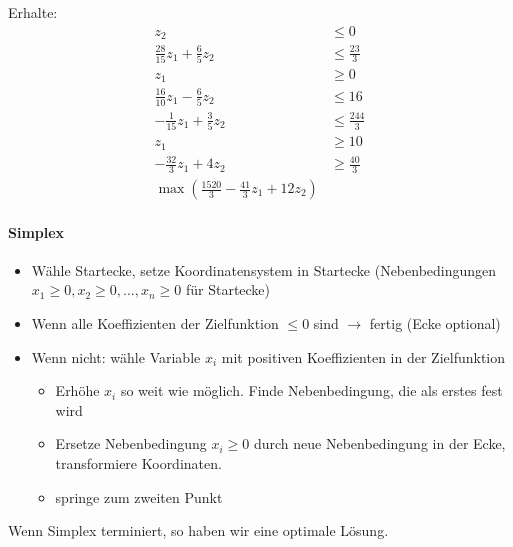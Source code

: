 \begin{itemize}
    Erhalte:
\begin{align*}
 z_2 &\leq 0 \tag{1} \\
 \frac{28}{15} z_1 + \frac{6}{5} z_2 &\leq \frac{23}{3}  \tag{2} \\
 z_1&\geq 0 \tag{3} \\
 \frac{16}{10} z_1 - \frac{6}{5} z_2 &\leq 16 \tag{4} \\
 -\frac{1}{15} z_1 + \frac{3}{5} z_2 &\leq \frac{244}{3} \tag{5} \\
 z_1 &\geq 10 \tag{6} \\
 - \frac{32}{3} z_1 + 4 z_2 &\geq \frac{40}{3} \tag{7} \\
 \max \left(\frac{1520}{3} - \frac{41}{3} z_1 + 12 z_2\right) \tag*{Zielfunktion} 
\end{align*}
\end{itemize}
\paragraph*{Simplex}
\begin{itemize}
 \item Wähle Startecke, setze Koordinatensystem in Startecke (Nebenbedingungen $x_1 \geq 0, x_2 \geq 0, ..., x_n \geq 0$ für Startecke)
 \item Wenn alle Koeffizienten der Zielfunktion $\leq 0$ sind $\rightarrow$ fertig (Ecke optional)
 \item Wenn nicht: wähle Variable $x_i$ mit positiven Koeffizienten in der Zielfunktion
     \begin{itemize}
      \item Erhöhe $x_i$ so weit wie möglich. Finde Nebenbedingung, die als erstes fest wird
      \item Ersetze Nebenbedingung $x_i \geq 0$ durch neue Nebenbedingung in der Ecke, transformiere Koordinaten.
      \item springe zum zweiten Punkt
     \end{itemize}
\end{itemize}
Wenn Simplex terminiert, so haben wir eine optimale Lösung.


